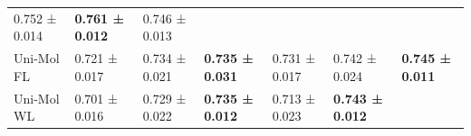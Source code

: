 \documentclass[
  10pt,
]{article}
\begin{document}
\begin{longtable}[]{@{}lllllll@{}}
\begin{minipage}[t]{0.12\columnwidth}
0.752 ± 0.014\strut
\end{minipage} & \begin{minipage}[t]{0.12\columnwidth}\raggedright
\textbf{0.761 ± 0.012}\strut
\end{minipage} & \begin{minipage}[t]{0.12\columnwidth}\raggedright
0.746 ± 0.013\strut
\end{minipage}\tabularnewline
\begin{minipage}[t]{0.12\columnwidth}\raggedright
Uni-Mol FL\strut
\end{minipage} & \begin{minipage}[t]{0.12\columnwidth}\raggedright
0.721 ± 0.017\strut
\end{minipage} & \begin{minipage}[t]{0.12\columnwidth}\raggedright
0.734 ± 0.021\strut
\end{minipage} & \begin{minipage}[t]{0.12\columnwidth}\raggedright
\textbf{0.735 ± 0.031}\strut
\end{minipage} & \begin{minipage}[t]{0.12\columnwidth}\raggedright
0.731 ± 0.017\strut
\end{minipage} & \begin{minipage}[t]{0.12\columnwidth}\raggedright
0.742 ± 0.024\strut
\end{minipage} & \begin{minipage}[t]{0.12\columnwidth}\raggedright
\textbf{0.745 ± 0.011}\strut
\end{minipage}\tabularnewline
\begin{minipage}[t]{0.12\columnwidth}\raggedright
Uni-Mol WL\strut
\end{minipage} & \begin{minipage}[t]{0.12\columnwidth}\raggedright
0.701 ± 0.016\strut
\end{minipage} & \begin{minipage}[t]{0.12\columnwidth}\raggedright
0.729 ± 0.022\strut
\end{minipage} & \begin{minipage}[t]{0.12\columnwidth}\raggedright
\textbf{0.735 ± 0.012}\strut
\end{minipage} & \begin{minipage}[t]{0.12\columnwidth}\raggedright
0.713 ± 0.023\strut
\end{minipage} & \begin{minipage}[t]{0.12\columnwidth}\raggedright
\textbf{0.743 ± 0.012}\strut
\end{minipage} & \begin{minipage}[t]{0.12\columnwidth}\raggedright

\end{minipage}
\end{longtable}
\end{document}
